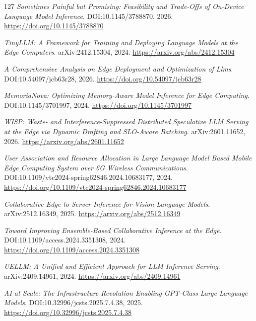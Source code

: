 \documentclass[11pt,a4paper]{article}
\begin{document}
\begin{thebibliography}{127}
\newblock \emph{Sometimes Painful but Promising: Feasibility and Trade-Offs of On-Device Language Model Inference}.
\newblock DOI:10.1145/3788870, 2026.
\newblock \url{https://doi.org/10.1145/3788870}

\newblock \emph{TinyLLM: A Framework for Training and Deploying Language Models at the Edge Computers}.
\newblock arXiv:2412.15304, 2024.
\newblock \url{https://arxiv.org/abs/2412.15304}

\newblock \emph{A Comprehensive Analysis on Edge Deployment and Optimization of Llms}.
\newblock DOI:10.54097/jcb63r28, 2026.
\newblock \url{https://doi.org/10.54097/jcb63r28}

\newblock \emph{MemoriaNova: Optimizing Memory-Aware Model Inference for Edge Computing}.
\newblock DOI:10.1145/3701997, 2024.
\newblock \url{https://doi.org/10.1145/3701997}

\newblock \emph{WISP: Waste- and Interference-Suppressed Distributed Speculative LLM Serving at the Edge via Dynamic Drafting and SLO-Aware Batching}.
\newblock arXiv:2601.11652, 2026.
\newblock \url{https://arxiv.org/abs/2601.11652}

\newblock \emph{User Association and Resource Allocation in Large Language Model Based Mobile Edge Computing System over 6G Wireless Communications}.
\newblock DOI:10.1109/vtc2024-spring62846.2024.10683177, 2024.
\newblock \url{https://doi.org/10.1109/vtc2024-spring62846.2024.10683177}

\newblock \emph{Collaborative Edge-to-Server Inference for Vision-Language Models}.
\newblock arXiv:2512.16349, 2025.
\newblock \url{https://arxiv.org/abs/2512.16349}

\newblock \emph{Toward Improving Ensemble-Based Collaborative Inference at the Edge}.
\newblock DOI:10.1109/access.2024.3351308, 2024.
\newblock \url{https://doi.org/10.1109/access.2024.3351308}

\newblock \emph{UELLM: A Unified and Efficient Approach for LLM Inference Serving}.
\newblock arXiv:2409.14961, 2024.
\newblock \url{https://arxiv.org/abs/2409.14961}

\newblock \emph{AI at Scale: The Infrastructure Revolution Enabling GPT-Class Large Language Models}.
\newblock DOI:10.32996/jcsts.2025.7.4.38, 2025.
\newblock \url{https://doi.org/10.32996/jcsts.2025.7.4.38}


\end{thebibliography}
\end{document}
